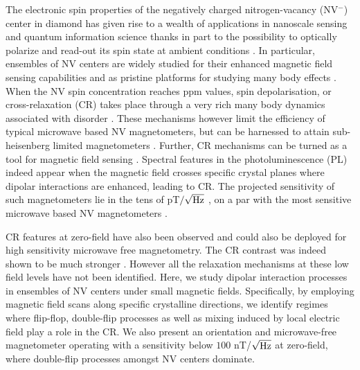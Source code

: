 \documentclass[preprintnumbers,amsmath,amssymb,superscriptaddress,twocolumn,showpacs]{revtex4-2}
\begin{document}
The electronic spin properties of the negatively charged nitrogen-vacancy (NV$^-$) center in diamond has given rise to a wealth of applications in nanoscale sensing and quantum information science thanks in part to the possibility to optically polarize and read-out its spin state at ambient conditions \cite{DOHERTY20131}. In particular, ensembles of NV centers are widely studied for their enhanced magnetic field sensing capabilities \cite{Acosta, TALLAIRE2020421,edmonds2021characterisation, chatzidrosos2021fiberized} and as pristine platforms for studying many body effects \citep{kucsko2018critical, ChoiNat, ZuYao, dwyer2021probing}. When the NV spin concentration reaches ppm values, spin depolarisation, or cross-relaxation (CR) takes place through a very rich many body dynamics associated with disorder \citep{choi_observation_2017}. These mechanisms however limit the efficiency of typical microwave based NV magnetometers, but can be harnessed to attain sub-heisenberg limited magnetometers \citep{zhou2020quantum}. Further, CR mechanisms can be turned as a tool for magnetic field sensing \cite{akhmedzhanov_microwave-free_2017, akhmedzhanov_magnetometry_2019}. 
Spectral features in the photoluminescence (PL) indeed appear when the magnetic field crosses specific crystal planes where dipolar interactions are enhanced, leading to CR. The projected sensitivity of such magnetometers lie in the tens of pT$/\sqrt{\rm Hz}$  \cite{akhmedzhanov_microwave-free_2017}, on a par with the most sensitive microwave based NV magnetometers \cite{Wolf, Sturner}. 

CR features at zero-field have also been observed and could also be deployed for high sensitivity microwave free magnetometry.
The CR contrast was indeed shown to be much stronger \citep{jarmola_longitudinal_2015,  mrozek_longitudinal_2015}. However all the relaxation mechanisms at these low field levels have not been identified. 
Here, we study dipolar interaction processes in ensembles of NV centers under small magnetic fields. Specifically, by employing magnetic field scans along specific crystalline directions, we identify regimes where flip-flop, double-flip processes as well as mixing induced by local electric field play a role in the CR. We also present an orientation and microwave-free magnetometer operating with a sensitivity below $100$ nT/$\sqrt{\rm Hz}$ at zero-field, where double-flip processes amongst NV centers dominate.
\end{document}
